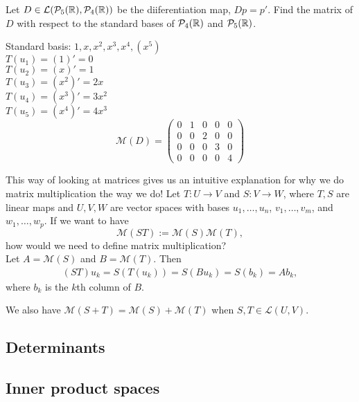\documentclass{article}
\begin{document}
\begin{example}
Let $D \in \mathcal{L}(\mathcal{P}_5({\mathbb{R}}),\mathcal{P}_4({\mathbb{R}}))$ be the diiferentiation map, $Dp = p'$. Find the matrix of $D$ with respect to the standard bases of $\mathcal{P}_4({\mathbb{R}})$ and $\mathcal{P}_5({\mathbb{R}})$.

Standard basis: $1, x, x^2, x^3, x^4, (x^5)$ \\
$T(u_1) = (1)' = 0$ \\
$T(u_2) = (x)' = 1$ \\ 
$T(u_3) = (x^2)' = 2 x$ \\ 
$T(u_4) = (x^3)' = 3 x^2$ \\
$T(u_5) = (x^4)' = 4 x^3$ \\

\begin{equation*}
    \mathcal{M}(D) = \begin{pmatrix}
    0 & 1 & 0 & 0 & 0 \\
    0 & 0 & 2 & 0 & 0 \\
    0 & 0 & 0 & 3 & 0 \\
    0 & 0 & 0 & 0 & 4
     \end{pmatrix}
\end{equation*}
\end{example}

This way of looking at matrices gives us an intuitive explanation for why we do matrix multiplication the way we do!
Let $T: U \to V$ and $S:V \to W$, where $T, S$ are linear maps and $U,V,W$ are vector spaces with bases $u_1, \ldots, u_n$, $v_1, \ldots, v_m$, and $w_1, \ldots, w_p$. If we want to have 
\begin{equation*}
    \mathcal{M}(ST) := \mathcal{M}(S) \mathcal{M}(T),
\end{equation*}
how would we need to define matrix multiplication? \\
Let $A = \mathcal{M}(S)$ and $B = \mathcal{M}(T)$. Then
\begin{align*}
    (ST)u_k = S(T(u_k)) = S(B u_k) = S(b_k) = Ab_k,
\end{align*}
where $b_k$ is the $k$th column of $B$.

We also have $\mathcal{M}(S+T) = \mathcal{M}(S) + \mathcal{M}(T)$ when $S,T \in \mathcal{L}(U,V)$.


\subsection{Determinants}

\subsection{Inner product spaces}
\end{document}

